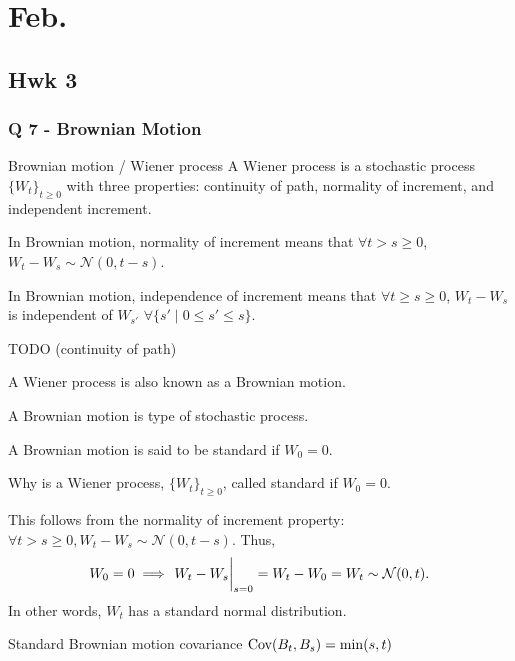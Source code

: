 \chapter{Feb. }

\section{Hwk 3}

\subsection{Q 7 - Brownian Motion }
\begin{definition}{Brownian motion / Wiener process}{}
	A Wiener process is a stochastic process $\{ W_t \}_{t\geq 0 }$ with three properties: continuity of path, normality of increment, and independent increment.

	\cloze In Brownian motion, normality of increment means that $\forall t> s \geq 0$, $ W_t - W_s \sim \mathcal{N}(0, t-s)$.

	\cloze In Brownian motion, independence of increment means that $\forall t \geq s\geq 0 $, $ W_t - W_s $ is independent of $ W_{s'} $ $\forall \{ s' \mid 0 \leq s' \leq s \}$. 

	\cloze TODO (continuity of path)
\end{definition}

\begin{quest}
\item \cloze A Wiener process is also known as a Brownian motion.  

\cloze A Brownian motion is type of stochastic process.

\cloze A Brownian motion is said to be standard if $ W_0 = 0 $. 

\item Why is a Wiener process, $\{ W_t \}_{t \geq 0}$, called standard if $ W_0 = 0 $. 
\begin{ans}
	This follows from the normality of increment property: $\forall t > s \geq 0, W_t - W_s\sim \mathcal{N}(0, t-s)$. Thus, \[ W_0 = 0 \implies \eval{W_t - W_s}_{s=0} = W_t - W_0 = W_t \sim \mathcal{N}(0, t). \]
	In other words, $W_t$ has a standard normal distribution. 
\end{ans}
\end{quest}

\begin{fact}{Standard Brownian motion covariance}{}
$\text{Cov}(B_t, B_s) = \min(s, t)$
\end{fact}

